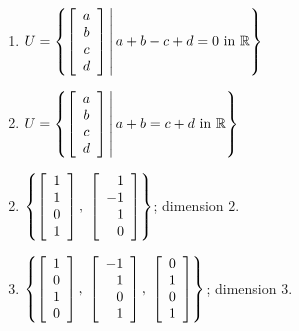 \begin{multicols}{2}
\begin{ex}
\begin{enumerate}[label={\alph*.}]
\item %
$U = \left \{
\left[ \begin{array}{c}
a \\
b \\
c \\
d
\end{array} \right] \,
\middle| \, a + b - c + d = 0 \mbox{ in } \mathbb{R}
\right \} $

\item %
$U = \left \{
\left[ \begin{array}{c}
a \\
b \\
c \\
d
\end{array} \right] \,
\middle| \, a + b = c + d \mbox{ in } \mathbb{R}
\right \} $

\end{enumerate}
\begin{sol}
\begin{enumerate}[label={\alph*.}]
\setcounter{enumi}{1}
\item  
$\left \{
\left[ \begin{array}{r}
1 \\
1 \\
0 \\
1
\end{array} \right]
,\
\left[ \begin{array}{r}
1 \\
-1 \\
1 \\
0
\end{array} \right]
\right \}
$; dimension $2$.

\setcounter{enumi}{3}
\item 
$\left \{
\left[ \begin{array}{r}
	1 \\
	0 \\
	1 \\
	0
\end{array} \right]
,\
\left[ \begin{array}{r}
	-1 \\
	 1 \\
	 0 \\
	 1
\end{array} \right]
,\
\left[ \begin{array}{r}
	0 \\
	1 \\
	0 \\
	1
\end{array} \right]
\right \}
$; dimension $3$.


\end{enumerate}
\end{sol}
\end{ex}
\end{multicols}
